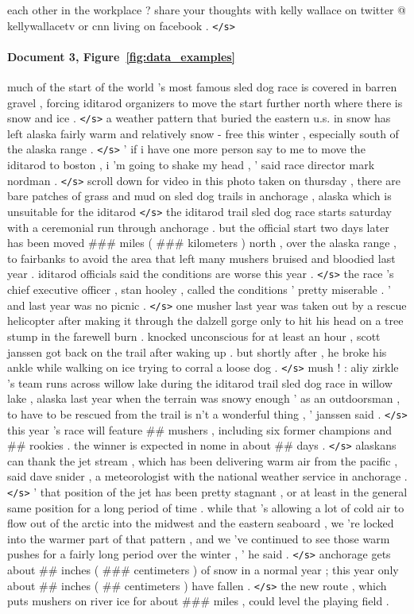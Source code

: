 \documentclass[12pt]{report}
\begin{document}
\begin{appendices}
each other in the workplace ? share your thoughts with kelly wallace on twitter @ kellywallacetv or cnn living on facebook . \texttt{</s>}

\paragraph{Document 3, Figure~\ref{fig:data_examples}}  much of the start of the world 's most famous sled dog race is covered in barren gravel , forcing iditarod organizers to move the start further north where there is snow and ice . \texttt{</s>} a weather pattern that buried the eastern u.s. in snow has left alaska fairly warm and relatively snow - free this winter , especially south of the alaska range . \texttt{</s>} ' if i have one more person say to me to move the iditarod to boston , i 'm going to shake my head , ' said race director mark nordman . \texttt{</s>} scroll down for video in this photo taken on thursday , there are bare patches of grass and mud on sled dog trails in anchorage , alaska which is unsuitable for the iditarod \texttt{</s>} the iditarod trail sled dog race starts saturday with a ceremonial run through anchorage . but the official start two days later has been moved \#\#\# miles ( \#\#\# kilometers ) north , over the alaska range , to fairbanks to avoid the area that left many mushers bruised and bloodied last year . iditarod officials said the conditions are worse this year . \texttt{</s>} the race 's chief executive officer , stan hooley , called the conditions ' pretty miserable . ' and last year was no picnic . \texttt{</s>} one musher last year was taken out by a rescue helicopter after making it through the dalzell gorge only to hit his head on a tree stump in the farewell burn . knocked unconscious for at least an hour , scott janssen got back on the trail after waking up . but shortly after , he broke his ankle while walking on ice trying to corral a loose dog . \texttt{</s>} mush ! : aliy zirkle 's team runs across willow lake during the iditarod trail sled dog race in willow lake , alaska last year when the terrain was snowy enough ' as an outdoorsman , to have to be rescued from the trail is n't a wonderful thing , ' janssen said . \texttt{</s>} this year 's race will feature \#\# mushers , including six former champions and \#\# rookies . the winner is expected in nome in about \#\# days . \texttt{</s>} alaskans can thank the jet stream , which has been delivering warm air from the pacific , said dave snider , a meteorologist with the national weather service in anchorage . \texttt{</s>} ' that position of the jet has been pretty stagnant , or at least in the general same position for a long period of time . while that 's allowing a lot of cold air to flow out of the arctic into the midwest and the eastern seaboard , we 're locked into the warmer part of that pattern , and we 've continued to see those warm pushes for a fairly long period over the winter , ' he said . \texttt{</s>} anchorage gets about \#\# inches ( \#\#\# centimeters ) of snow in a normal year ; this year only about \#\# inches ( \#\# centimeters ) have fallen . \texttt{</s>} the new route , which puts mushers on river ice for about \#\#\# miles , could level the playing field . 
\end{appendices}
\end{document}
